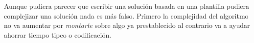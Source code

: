 Aunque pudiera parecer que escribir una solución basada en una plantilla pudiera complejizar una solución nada es más falso. Primero la complejidad del algoritmo no va aumentar por \emph{montarte} sobre algo ya prestablecido al contrario va a ayudar ahorrar tiempo tipeo o codificación.